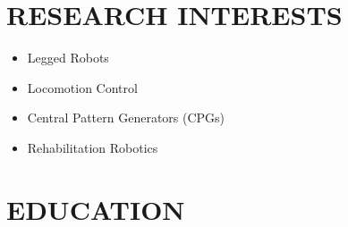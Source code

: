 \documentclass[10pt,a4paper,sans]{moderncv} %
\begin{document}
	
	\makecvtitle
    \vspace{-2.5em}
	\section{RESEARCH INTERESTS}
	\vspace{-1.25em}
	\begin{multicols}{2}
	\begin{itemize}[nosep]
		\item Legged Robots 
		\item Locomotion Control
		\item Central Pattern Generators (CPGs)
		\item Rehabilitation Robotics
	\end{itemize}
	\end{multicols}
	
	\vspace{-1em}
	
	\section{EDUCATION}
	
\end{document}
